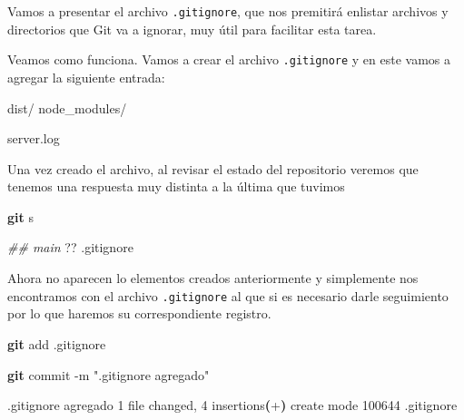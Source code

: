 \documentclass[
]{book}
\newenvironment{Shaded}{\begin{snugshade}}{\end{snugshade}}
\newcommand{\AttributeTok}[1]{\textcolor[rgb]{0.13,0.29,0.53}{#1}}
\newcommand{\CommentTok}[1]{\textcolor[rgb]{0.56,0.35,0.01}{\textit{#1}}}
\newcommand{\ErrorTok}[1]{\textcolor[rgb]{0.64,0.00,0.00}{\textbf{#1}}}
\newcommand{\ExtensionTok}[1]{#1}
\newcommand{\FunctionTok}[1]{\textcolor[rgb]{0.13,0.29,0.53}{\textbf{#1}}}
\newcommand{\KeywordTok}[1]{\textcolor[rgb]{0.13,0.29,0.53}{\textbf{#1}}}
\newcommand{\NormalTok}[1]{#1}
\newcommand{\StringTok}[1]{\textcolor[rgb]{0.31,0.60,0.02}{#1}}
\begin{document}
Vamos a presentar el archivo \texttt{.gitignore}, que nos premitirá enlistar archivos y directorios que Git va a ignorar, muy útil para facilitar esta tarea.

Veamos como funciona. Vamos a crear el archivo \texttt{.gitignore} y en este vamos a agregar la siguiente entrada:

\begin{Shaded}
\begin{Highlighting}[]
\ExtensionTok{dist/}
\ExtensionTok{node\_modules/}

\ExtensionTok{server.log}
\end{Highlighting}
\end{Shaded}

Una vez creado el archivo, al revisar el estado del repositorio veremos que tenemos una respuesta muy distinta a la última que tuvimos

\begin{Shaded}
\begin{Highlighting}[]
\FunctionTok{git}\NormalTok{ s}
\end{Highlighting}
\end{Shaded}

\begin{Shaded}
\begin{Highlighting}[]
\CommentTok{\#\# main}
\ExtensionTok{??}\NormalTok{ .gitignore}
\end{Highlighting}
\end{Shaded}

Ahora no aparecen lo elementos creados anteriormente y simplemente nos encontramos con el archivo \texttt{.gitignore} al que si es necesario darle seguimiento por lo que haremos su correspondiente registro.

\begin{Shaded}
\begin{Highlighting}[]
\FunctionTok{git}\NormalTok{ add .gitignore}
\end{Highlighting}
\end{Shaded}

\begin{Shaded}
\begin{Highlighting}[]
\FunctionTok{git}\NormalTok{ commit }\AttributeTok{{-}m} \StringTok{".gitignore agregado"}
\end{Highlighting}
\end{Shaded}

\begin{Shaded}
\begin{Highlighting}[]
\ExtensionTok{[main}\NormalTok{ 2ed8cf4] .gitignore agregado}
 \ExtensionTok{1}\NormalTok{ file changed, 4 insertions}\ErrorTok{(}\ExtensionTok{+}\KeywordTok{)}
 \ExtensionTok{create}\NormalTok{ mode 100644 .gitignore}
\end{Highlighting}
\end{Shaded}
\end{document}
